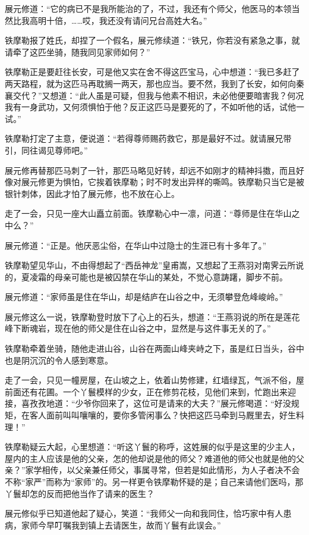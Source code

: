\documentclass[12pt,oneside]{book}
\begin{document}
展元修道：``它的病已不是我所能治的了，不过，我还有个师父，他医马的本领当然比我高明十倍，\ldots\ldots 哎，我还没有请问兄台高姓大名。''

铁摩勒报了姓氏，却捏了一个假名，展元修续道：``铁兄，你若没有紧急之事，就请牵了这匹坐骑，随我同见家师如何？''

铁摩勒正是要赶往长安，可是他又实在舍不得这匹宝马，心中想道：``我已多赶了两天路程，就为这匹马再耽搁一两天，那也应当。要不然，我到了长安，如何向秦襄交代？''又想道：``此人虽是可疑，但我与他素不相识，未必他便要暗害我？何况我有一身武功，又何须惧怕于他？反正这匹马是要死的了，不如听他的话，试他一试。''

铁摩勒打定了主意，便说道：``若得尊师赐药救它，那是最好不过。就请展兄带引，同往谒见尊师吧。''

展元修再替那匹马刺了一针，那匹马略见好转，却远不如刚才的精神抖擞，而且好像对展元修更为惧怕，它挨着铁摩勒；时不时发出异样的嘶鸣。铁摩勒只当它是被银针刺体，因此才怕了展元修，也不放在心上。

走了一会，只见一座大山矗立前面。铁摩勒心中一凛，问道：``尊师是住在华山之中么？''

展元修道：``正是。他厌恶尘俗，在华山中过隐士的生涯已有十多年了。''

铁摩勒望见华山，不由得想起了``西岳神龙''皇甫嵩，又想起了王燕羽对南霁云所说的，夏凌霜的母亲可能也是被囚禁在华山的某处，不觉心意踌躇，脚步不前。

展元修道：``家师虽是住在华山，却是结庐在山谷之中，无须攀登危峰峻岭。''

展元修这么一说，铁摩勒登时放下了心上的石头，想道：``王燕羽说的所在是莲花峰下断魂岩，现在他的师父是住在山谷之中，显然是与这件事无关的了。''

铁摩勒牵着坐骑，随他走进山谷，山谷在两面山峰夹峙之下，虽是红日当头，谷中也是阴沉沉的令人感到寒意。

走了一会，只见一幢房屋，在山坡之上，依着山势修建，红墙绿瓦，气派不俗，屋前面还有花圃。一个丫鬟模样的少女，正在修剪花枝，见他们来到，忙跑出来迎接，喜孜孜地道：``少爷你回来了，这位可是请来的大夫？''展元修喝道：``好没规矩，在客人面前叫叫嚷嚷的，要你多管闲事么？快把这匹马牵到马厩里去，好生料理！''

铁摩勒疑云大起，心里想道：``听这丫鬟的称呼，这姓展的似乎是这里的少主人，屋内的主人应该是他的父亲，怎的他却说是他的师父？难道他的师父也就是他的父亲？''家学相传，以父亲兼任师父，事属寻常，但若是如此情形，为人子者决不会不称``家严''而称为``家师''的。另一样更令铁摩勒怀疑的是；自己来请他们医吗，那丫鬟却怎的反而把他当作了请来的医生？

展元修似乎已知道他起了疑心，笑道：``我师父一向和我同住，恰巧家中有人患病，家师今早叮嘱我到镇上去请医生，故而丫鬟有此误会。''
\end{document}

